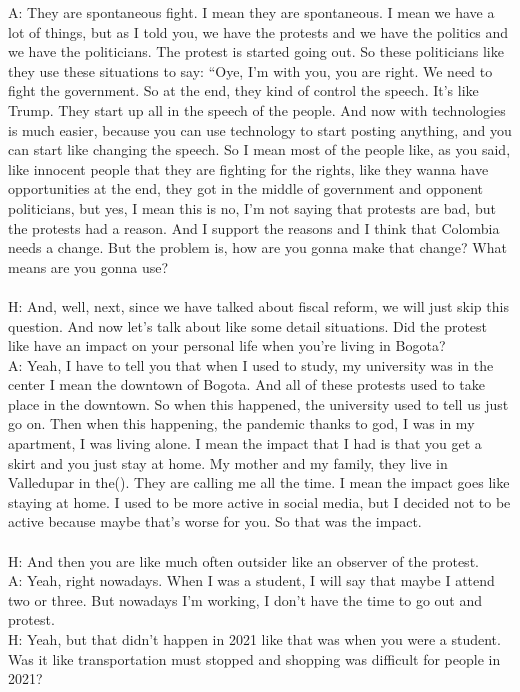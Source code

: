 \documentclass{phyasgn}\usepackage{nag}
\begin{document}
A: They are spontaneous fight. I mean they are spontaneous. I mean we have a lot of things, but as I told you, we have the protests and we have the politics and we have the politicians. The protest is started going out. So these politicians like they use these situations to say: “Oye, I'm with you, you are right. We need to fight the government. So at the end, they kind of control the speech. It's like Trump. They start up all in the speech of the people. And now with technologies is much easier, because you can use technology to start posting anything, and you can start like changing the speech. So I mean most of the people like, as you said, like innocent people that they are fighting for the rights, like they wanna have opportunities at the end, they got in the middle of government and opponent politicians, but yes, I mean this is no, I'm not saying that protests are bad, but the protests had a reason. And I support the reasons and I think that Colombia needs a change. But the problem is, how are you gonna make that change? What means are you gonna use?\\
\\
H: And, well, next, since we have talked about fiscal reform, we will just skip this question. And now let's talk about like some detail situations. Did the protest like have an impact on your personal life when you're living in Bogota?\\
A: Yeah, I have to tell you that when I used to study, my university was in the center I mean the downtown of Bogota. And all of these protests used to take place in the downtown. So when this happened, the university used to tell us just go on. Then when this happening, the pandemic thanks to god, I was in my apartment, I was living alone. I mean the impact that I had is that you get a skirt and you just stay at home. My mother and my family, they live in Valledupar in the(). They are calling me all the time. I mean the impact goes like staying at home. I used to be more active in social media, but I decided not to be active because maybe that's worse for you. So that was the impact.\\
\\
H: And then you are like much often outsider like an observer of the protest.\\
A: Yeah, right nowadays. When I was a student, I will say that maybe I attend two or three. But nowadays I'm working, I don't have the time to go out and protest.\\
H: Yeah, but that didn't happen in 2021 like that was when you were a student. Was it like transportation must stopped and shopping was difficult for people in 2021?\\
\end{document}
